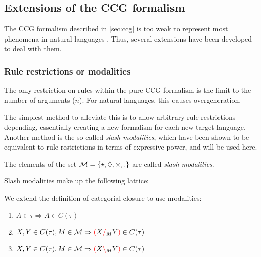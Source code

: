 \documentclass[main.tex]{subfiles}
\begin{document}
\subsection{ Extensions of the CCG formalism}
\label{sec:hacks}

The CCG formalism described in \ref{sec:ccg} is too weak to represent most
phenomena in natural languages \cite{steedman}. Thus, several extensions have
been developed to deal with them.

\subsubsection{Rule restrictions or modalities}
The only restriction on rules within the pure CCG formalism is the limit to
the number of arguments ($n$). For natural languages, this causes overgeneration.

The simplest method to alleviate this is to allow arbitrary rule restrictions
depending, essentially creating a new formalism for each new target language.
Another method is the so called \emph{slash modalities}, which have been shown
\cite{modal}
to be equivalent to rule restrictions in terms of expressive power, and will
be used here.

\begin{defn}
    The elements of the set
    $\mathcal{M} = \{ \star, \lozenge, \times, . \}$ are called
    \emph{slash modalities}.

    Slash modalities make up the following lattice:

    \begin{center}
    \end{center}
\end{defn}

\begin{defn}
    We extend the definition of categorial closure to use modalities:
    \begin{enumerate}
        \item \label{cmod:atomic} $A \in \tau \Rightarrow A \in C(\tau)$
        \item \label{cmod:right}  $X, Y \in C(\tau), M \in \mathcal{M} \Rightarrow \textcolor{red}{(} X \textcolor{red}{/}_M Y \textcolor{red}{)} \in C(\tau)$
        \item \label{cmod:left}   $X, Y \in C(\tau), M \in \mathcal{M} \Rightarrow \textcolor{red}{(} X \textcolor{red}{\backslash}_M Y \textcolor{red}{)} \in C(\tau)$
    \end{enumerate}
\end{defn}
\end{document}
